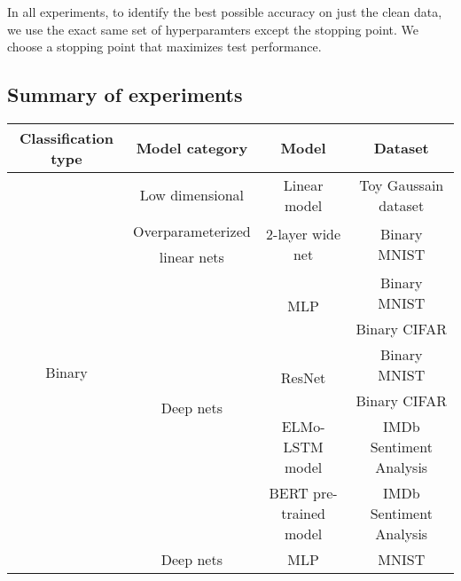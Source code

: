In all experiments, to identify the best possible accuracy on just the clean data, we use the exact same set of hyperparamters except the stopping point. We choose a stopping point that maximizes test performance. 

\subsection{Summary of experiments }

\begin{center}
    \begin{table}[H] 
        \centering
        \begin{tabular}{|c|c|c|c|} 
        \hline
        Classification type & Model category & Model & Dataset  \\ [0.5ex] 
        \hline
        \hline
        \multirow{10}{*}{Binary} & Low dimensional & Linear model & Toy Gaussain dataset  \\
                        \cline{2-4}
                         & Overparameterized 
                         & \multirow{2}{*}{2-layer wide net} & \multirow{2}{*}{Binary MNIST} \\
                         & linear nets & &  
                         \\
                         \cline{2-4}                 
                         & \multirow{6}{*}{Deep nets} & \multirow{2}{*}{MLP} & Binary MNIST \\
                         \cline{4-4}
                         & &  & Binary CIFAR \\
                         \cline{3-4}
                         &  & \multirow{2}{*}{ResNet} & Binary MNIST \\
                         \cline{4-4}
                         & &  & Binary CIFAR \\
                         \cline{3-4}
                         &  & ELMo-LSTM model & IMDb Sentiment Analysis \\
                         \cline{3-4}
                         & & BERT pre-trained model & IMDb Sentiment Analysis \\
        \hline
        \multirow{5}{*}{Multiclass} & \multirow{5}{*}{Deep nets} & \multirow{2}{*}{MLP} & MNIST \\

\end{tabular}
\end{table}
\end{center}
